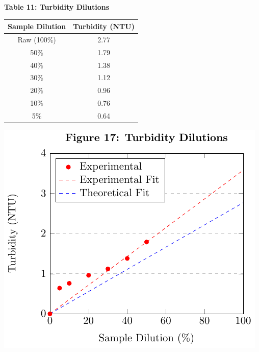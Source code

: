 \begin{center}

\begin{minipage}{.5\textwidth}
\centering
{\large{\bf Table 11: Turbidity Dilutions\\}}
\vspace{3 mm}
\begin{tabular}{|c c|}
    \hline
    \textbf{Sample Dilution} & \textbf{Turbidity (NTU)} \\\hline
    Raw (100\%)  & 2.77 \\
    50\% & 1.79 \\
    40\% & 1.38  \\
    30\% & 1.12  \\
    20\% & 0.96   \\
    10\% & 0.76   \\
    5\%  & 0.64   \\\hline
\end{tabular}
\end{minipage}%
\begin{minipage}{.5\textwidth}
\centering
{}
\includegraphics*[page=1]{figs/fig17.pdf}
\end{minipage}

\end{center}